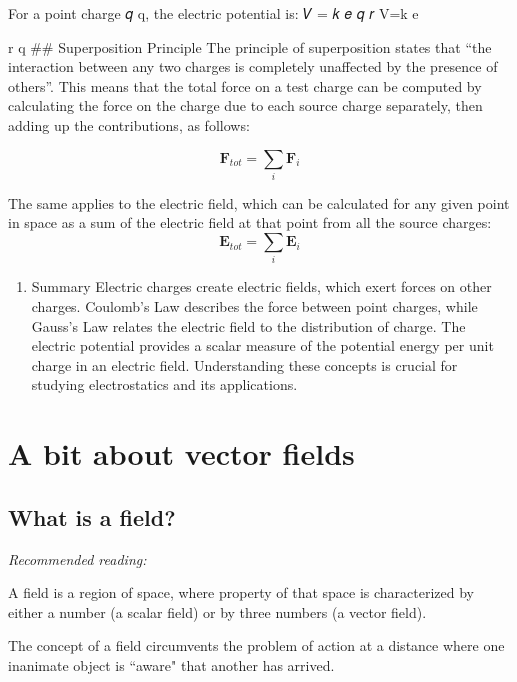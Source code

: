 \documentclass[
  letterpaper,
  DIV=11,
  numbers=noendperiod]{scrreprt}
\providecommand{\tightlist}{%
  \setlength{\itemsep}{0pt}\setlength{\parskip}{0pt}}\usepackage{longtable,booktabs,array}
\begin{document}
For a point charge 𝑞 q, the electric potential is: 𝑉 = 𝑘 𝑒 𝑞 𝑟 V=k e
\hspace{0pt}

r q \hspace{0pt} \#\# Superposition Principle The principle of
superposition states that ``the interaction between any two charges is
completely unaffected by the presence of others''. This means that the
total force on a test charge can be computed by calculating the force on
the charge due to each source charge separately, then adding up the
contributions, as follows:

\[ \mathrm{\mathbf{F}}_{tot} = \sum_i \mathrm{\mathbf{F}}_i \]

The same applies to the electric field, which can be calculated for any
given point in space as a sum of the electric field at that point from
all the source charges:
\[ \mathrm{\mathbf{E}}_{tot} = \sum_i \mathrm{\mathbf{E}}_i \]

\begin{enumerate}
\def\labelenumi{\arabic{enumi}.}
\setcounter{enumi}{10}
\tightlist
\item
  Summary Electric charges create electric fields, which exert forces on
  other charges. Coulomb's Law describes the force between point
  charges, while Gauss's Law relates the electric field to the
  distribution of charge. The electric potential provides a scalar
  measure of the potential energy per unit charge in an electric field.
  Understanding these concepts is crucial for studying electrostatics
  and its applications.
\end{enumerate}

\section{A bit about vector fields}\label{a-bit-about-vector-fields}

\subsection{What is a field?}\label{what-is-a-field}

\emph{Recommended reading:}

A field is a region of space, where property of that space is
characterized by either a number (a scalar field) or by three numbers (a
vector field).

The concept of a field circumvents the problem of action at a distance
where one inanimate object is ``aware" that another has arrived.
\end{document}
